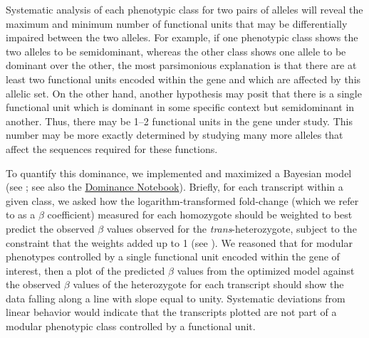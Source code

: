 \documentclass[10pt, twocolumn]{article}
\begin{document}
Systematic analysis of each phenotypic class for two pairs of alleles will
reveal the maximum and minimum number of functional units that may be
differentially impaired between the two alleles. For example, if one phenotypic
class shows the two alleles to be semidominant, whereas the other class shows
one allele to be dominant over the other, the most parsimonious explanation is
that there are at least two functional units encoded within the gene and which
are affected by this allelic set. On the other hand, another hypothesis may posit
that there is a single functional unit which is dominant in some specific context
but semidominant in another. Thus, there may be 1--2 functional units in the gene
under study. This number may be more exactly determined by studying many more
alleles that affect the sequences required for these functions.

To quantify this dominance, we implemented and maximized a Bayesian model (see
; see also the
\href{https://wormlabcaltech.github.io/med-cafe/notebook/dominance.html}{Dominance
Notebook}). Briefly, for each transcript within a given class, we asked how the
logarithm-transformed fold-change (which we refer to as a $\beta$ coefficient)
measured for each homozygote should be weighted to best predict the observed
$\beta$ values observed for the \emph{trans}-heterozygote, subject to the
constraint that the weights added up to 1 (see ). We
reasoned that for modular phenotypes controlled by a single functional unit
encoded within the gene of interest, then a plot of the predicted $\beta$ values
from the optimized model against the observed $\beta$ values of the heterozygote
for each transcript should show the data falling along a line with slope equal
to unity. Systematic deviations from linear behavior would indicate that the
transcripts plotted are not part of a modular phenotypic class controlled by a
functional unit.


\end{document}
